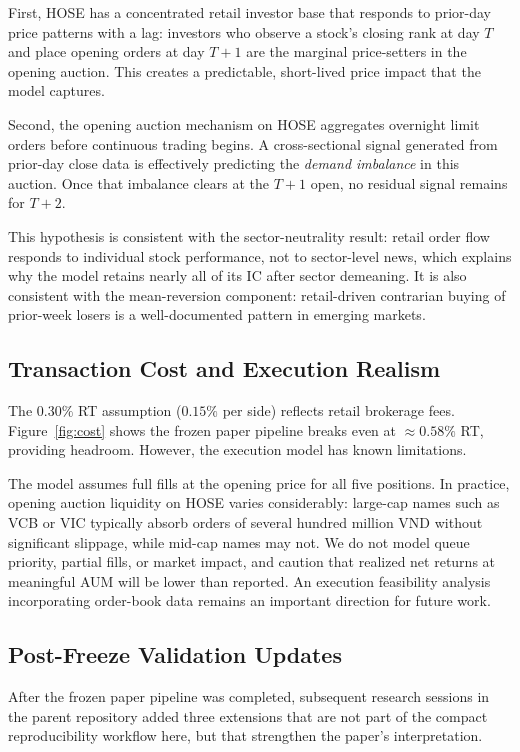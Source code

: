 \documentclass[12pt,a4paper]{article}
\begin{document}
First, HOSE has a concentrated retail investor base that responds to prior-day
price patterns with a lag: investors who observe a stock's closing rank at day $T$
and place opening orders at day $T+1$ are the marginal price-setters in the opening
auction. This creates a predictable, short-lived price impact that the model captures.

Second, the opening auction mechanism on HOSE aggregates overnight limit orders
before continuous trading begins. A cross-sectional signal generated from prior-day
close data is effectively predicting the \emph{demand imbalance} in this auction.
Once that imbalance clears at the $T+1$ open, no residual signal remains for $T+2$.

This hypothesis is consistent with the sector-neutrality result: retail order flow
responds to individual stock performance, not to sector-level news, which explains
why the model retains nearly all of its IC after sector demeaning.
It is also consistent with the mean-reversion component: retail-driven contrarian
buying of prior-week losers is a well-documented pattern in emerging markets.

\subsection{Transaction Cost and Execution Realism}
\label{sec:costs}

The $0.30\%$ RT assumption ($0.15\%$ per side) reflects retail brokerage fees.
Figure~\ref{fig:cost} shows the frozen paper pipeline breaks even at
$\approx 0.58\%$ RT,
providing headroom. However, the execution model has known limitations.

The model assumes full fills at the opening price for all five positions. In practice,
opening auction liquidity on HOSE varies considerably: large-cap names such as VCB or
VIC typically absorb orders of several hundred million VND without significant
slippage, while mid-cap names may not. We do not model queue priority, partial fills,
or market impact, and caution that realized net returns at meaningful AUM will be
lower than reported. An execution feasibility analysis incorporating order-book data
remains an important direction for future work.

\subsection{Post-Freeze Validation Updates}
\label{sec:postfreeze}

After the frozen paper pipeline was completed, subsequent research sessions in the
parent repository added three extensions that are not part of the compact
reproducibility workflow here, but that strengthen the paper's interpretation.
\end{document}
